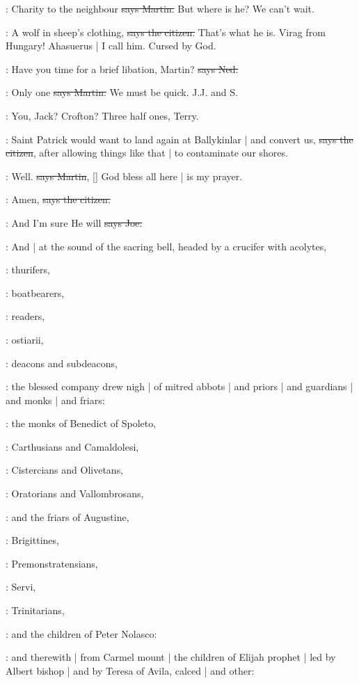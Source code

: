 \cunningham:
Charity to the neighbour
\sout{says Martin.}
But where is he?
We can't wait.

\citizen:
A wolf in sheep's clothing,
\sout{says the citizen.}
That's what he is.
Virag from Hungary!
Ahasuerus |
I call him.
Cursed by God.

\lambert:
Have you time for a brief libation,
Martin?
\sout{says Ned.}

\cunningham:
Only one
\sout{says Martin.}
We must be quick.
J.J. and S.

\lambert:
You,
Jack?
Crofton?
Three half ones,
Terry.

\citizen:
Saint Patrick would want to land again at Ballykinlar |
and convert us,
\sout{says the citizen},
after allowing things like that |
to contaminate our shores.

\cunningham:
Well.
\sout{says Martin},
[]
God bless all here |
is my prayer.

\citizen:
Amen,
\sout{says the citizen.}

\joe:
And I'm sure He will
\sout{says Joe.}

:
And |
at the sound of the sacring bell,
headed by a crucifer with acolytes,

:
thurifers,

:
boatbearers,

:
readers,

:
ostiarii,

:
deacons and subdeacons,

:
the blessed company drew nigh |
of mitred abbots |
and priors |
and guardians |
and monks |
and friars:

:
the monks of Benedict of Spoleto,

:
Carthusians and Camaldolesi,

:
Cistercians and Olivetans,

:
Oratorians and Vallombrosans,

:
and the friars of Augustine,

:
Brigittines,

:
Premonstratensians,

:
Servi,

:
Trinitarians,

:
and the children of Peter Nolasco:

:
and therewith |
from Carmel mount |
the children of Elijah prophet |
led by Albert bishop |
and by Teresa of Avila,
calced |
and other:

